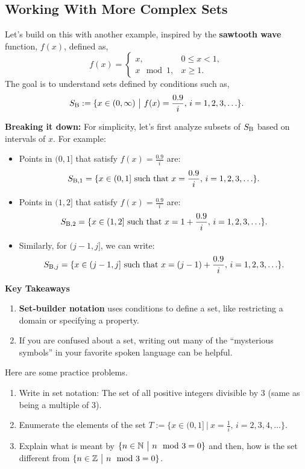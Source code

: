 \subsection*{Working With More Complex Sets}

Let’s build on this with another example, inspired by the \textbf{sawtooth wave} function, $f(x)$, defined as,
\[
f(x) = 
\begin{cases} 
x, & 0 \leq x < 1, \\
x \mod 1, & x \geq 1.
\end{cases}
\]
The goal is to understand sets defined by conditions such as,
\[
S_{\rm B} := \{ x \in (0, \infty) ~\big|~ f(x) = \frac{0.9}{i}, \, i = 1, 2, 3, \ldots \}.
\]

\textbf{Breaking it down:}
For simplicity, let’s first analyze subsets of $S_{\rm B}$ based on intervals of $x$. For example:
    \begin{itemize}
        \item Points in $(0, 1]$ that satisfy $f(x) = \frac{0.9}{i}$ are:
        \[
        S_{{\rm B},1} = \{x \in (0, 1] ~\text{such that}~ x = \frac{0.9}{i}, \, i = 1, 2, 3, \ldots \}.
        \]
        \item Points in $(1, 2]$ that satisfy $f(x) = \frac{0.9}{i}$ are:
        \[
        S_{{\rm B},2} = \{x \in (1, 2] ~\text{such that}~  x = 1 + \frac{0.9}{i}, \, i = 1, 2, 3, \ldots \}.
        \]
        \item Similarly, for $(j-1, j]$, we can write:
        \[
        S_{{\rm B},j} = \{x \in (j-1, j] ~\text{such that}~  x = (j-1) + \frac{0.9}{i}, \, i = 1, 2, 3, \ldots \}.
        \]
    \end{itemize}


\textbf{Key Takeaways}

\begin{enumerate}
    \item \textbf{Set-builder notation} uses conditions to define a set, like restricting a domain or specifying a property.
    \item If you are confused about a set,  writing out many of the ``mysterious symbols'' in your favorite spoken language can be helpful. 
\end{enumerate}

\bigskip

\begin{example}
\label{ex:SetNotationExamples}
Here are some practice problems.

\begin{enumerate}
\renewcommand{\labelenumi}{(\alph{enumi})}
\setlength{\itemsep}{.2cm}
    \item Write in set notation: The set of all positive integers divisible by 3 (same as being a multiple of 3).
    \item Enumerate the elements of the set $T := \{x \in (0, 1] ~\big|~ x = \frac{1}{i}, \, i = 2, 3, 4, \ldots\}$.
    \item Explain what is meant by $\{ n \in \mathbb N ~\big|~ n~~{\rm mod}~ 3 = 0\}$ and then, how is the set different from $\{ n \in \mathbb{Z} ~\big|~ n~~{\rm mod}~ 3 = 0\}$.

\end{enumerate}
\end{example}

